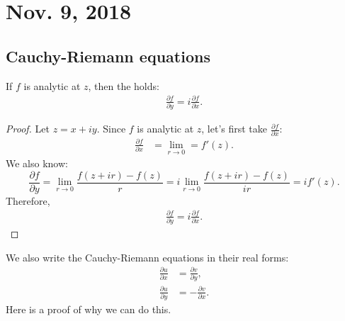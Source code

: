 \documentclass[notes]{subfile}
\begin{document}
\section{Nov. 9, 2018}
\subsection{Cauchy-Riemann equations}

\begin{theorem}
    If $f$ is analytic at $z$, then the  holds:
    \begin{align*}
        \frac{\partial f}{\partial y} = i \frac{\partial f}{\partial x}.
    \end{align*}
\end{theorem}

\begin{proof}
    Let $z = x + iy$.
    Since $f$ is analytic at $z$, let's first take $\frac{\partial f}{\partial x}$:
    \begin{align*}
        \frac{\partial f}{\partial x} &= \lim_{r \to 0} = f'(z).
    \end{align*}
    We also know:
    \[ \frac{\partial f}{\partial y} = \lim_{r \to 0} \frac{f(z+ir) - f(z)}{r} = i \lim_{r \to 0} \frac{f(z+ir) - f(z)}{ir} = if'(z). \]
    Therefore,
    \begin{align*}
        \frac{\partial f}{\partial y} = i \frac{\partial f}{\partial x}.
    \end{align*}
        
\end{proof}
\noindent
We also write the Cauchy-Riemann equations in their real forms:
\begin{align*}
    \frac{\partial u}{\partial x} &= \frac{\partial v}{\partial y}, \\
    \frac{\partial u}{\partial y} &= -\frac{\partial v}{\partial x}.
\end{align*}
Here is a proof of why we can do this.
\end{document}
